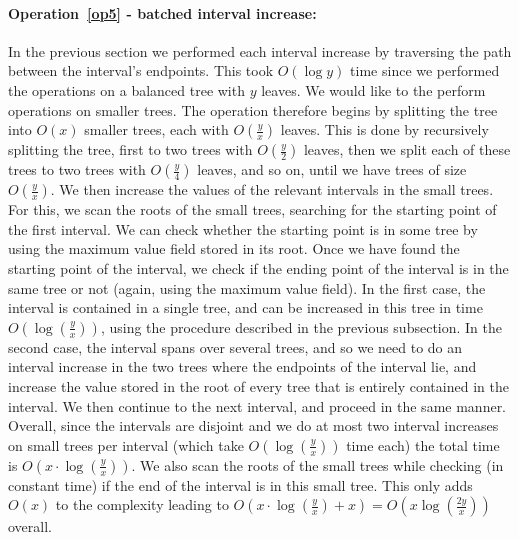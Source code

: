 \documentclass[11pt,a4paper]{article}
\theoremstyle{definition}
\theoremstyle{remark}
\begin{document}
\paragraph{Operation~\ref{op5} - batched interval increase:}
In the previous section we performed each interval increase by traversing the path between the interval's endpoints. This took $O(\log y)$ time since we performed the operations on a balanced tree with $y$ leaves. We would like to the perform operations on smaller trees. The operation therefore begins by splitting the tree into $O(x)$ smaller trees, each with $O(\frac{y}{x})$ leaves. This is done by recursively splitting the tree, first to two trees with $O(\frac{y}{2})$ leaves, then we split each of these trees to two trees with $O(\frac{y}{4})$ leaves, and so on, until we have trees of size $O(\frac{y}{x})$. We then increase the values of the relevant intervals in the small trees. For this, we scan the roots of the small trees, searching for the starting point of the first interval. We can check whether the starting point is in some tree by using the maximum value field stored in its root. Once we have found the starting point of the interval, we check if the ending point of the interval is in the same tree or not (again, using the maximum value field). In the first case, the interval is contained in a single tree, and can be increased in this tree in time $O(\log(\frac{y}{x}))$, using the procedure described in the previous subsection. In the second case, the interval spans over several trees, and so we need to do an interval increase in the two trees where the endpoints of the interval lie, and increase the value stored in the root of every tree that is entirely contained in the interval. We then continue to the next interval, and proceed in the same manner. 
%
Overall, since the intervals are disjoint and we do at most two interval increases on small trees per interval (which take $O(\log (\frac{y}{x}))$ time each) the total time is $O(x \cdot \log (\frac{y}{x}))$. We also scan the roots of the small trees while checking (in constant time) if the end of the interval is in this small tree. This only adds $O(x)$ to the complexity leading to 
 $O(x \cdot \log (\frac{y}{x}) + x) = O(x \log (\frac{2y}{x}))$ overall. 
 
\end{document}
